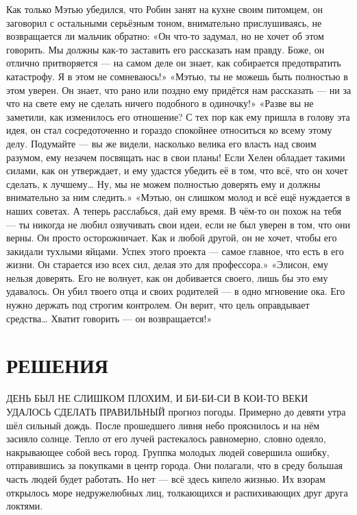 \documentclass[a4paper,12pt]{book}
\begin{document}
	Как только Мэтью убедился, что Робин занят на кухне своим питомцем, он заговорил с остальными серьёзным тоном, внимательно прислушиваясь, не возвращается ли мальчик обратно:
	«Он что-то задумал, но не хочет об этом говорить. Мы должны как-то заставить его рассказать нам правду. Боже, он отлично притворяется — на самом деле он знает, как собирается предотвратить катастрофу. Я в этом не сомневаюсь!»
	«Мэтью, ты не можешь быть полностью в этом уверен. Он знает, что рано или поздно ему придётся нам рассказать — ни за что на свете ему не сделать ничего подобного в одиночку!»
	«Разве вы не заметили, как изменилось его отношение? С тех пор как ему пришла в голову эта идея, он стал сосредоточенно и гораздо спокойнее относиться ко всему этому делу. Подумайте — вы же видели, насколько велика его власть над своим разумом, ему незачем посвящать нас в свои планы! Если Хелен обладает такими силами, как он утверждает, и ему удастся убедить её в том, что всё, что он хочет сделать, к лучшему… Ну, мы не можем полностью доверять ему и должны внимательно за ним следить.»
	«Мэтью, он слишком молод и всё ещё нуждается в наших советах. А теперь расслабься, дай ему время. В чём-то он похож на тебя — ты никогда не любил озвучивать свои идеи, если не был уверен в том, что они верны. Он просто осторожничает. Как и любой другой, он не хочет, чтобы его закидали тухлыми яйцами. Успех этого проекта — самое главное, что есть в его жизни. Он старается изо всех сил, делая это для профессора.»
	«Элисон, ему нельзя доверять. Его не волнует, как он добивается своего, лишь бы это ему удавалось. Он убил твоего отца и своих родителей — в одно мгновение ока. Его нужно держать под строгим контролем. Он верит, что цель оправдывает средства… Хватит говорить — он возвращается!»

\chapter{РЕШЕНИЯ}
	ДЕНЬ БЫЛ НЕ СЛИШКОМ ПЛОХИМ, И БИ-БИ-СИ В КОИ-ТО ВЕКИ УДАЛОСЬ СДЕЛАТЬ ПРАВИЛЬНЫЙ прогноз погоды. Примерно до девяти утра шёл сильный дождь. После прошедшего ливня небо прояснилось и на нём засияло солнце. Тепло от его лучей растекалось равномерно, словно одеяло, накрывающее собой весь город.
	Группка молодых людей совершила ошибку, отправившись за покупками в центр города. Они полагали, что в среду большая часть людей будет работать. Но нет — всё здесь кипело жизнью. Их взорам открылось море недружелюбных лиц, толкающихся и распихивающих друг друга локтями.
	
\end{document}
